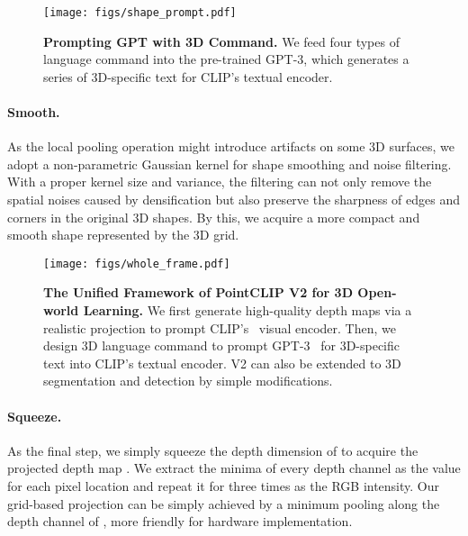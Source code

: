\documentclass[10pt,twocolumn,letterpaper]{article}
\begin{document}
\label{method:tasks}
\begin{figure}[t!]
\centering
\texttt{[image: figs/shape\_prompt.pdf]}
\vspace{0.15cm}
\caption{\textbf{Prompting GPT with 3D Command.} We feed four types of language command into the pre-trained GPT-3, which generates a series of 3D-specific text for CLIP's textual encoder.}
\label{fig:3d_command}
\vspace{-0.25cm}
\end{figure}

\vspace{-6pt}
\paragraph{Smooth.} 
As the local pooling operation might introduce artifacts on some 3D surfaces, we adopt a non-parametric Gaussian kernel for shape smoothing and noise filtering. With a proper kernel size and variance, the filtering can not only remove the spatial noises caused by densification but also preserve the sharpness of edges and corners in the original 3D shapes. By this, we acquire a more compact and smooth shape represented by the 3D grid.

\begin{figure*}[t!]
\centering
\texttt{[image: figs/whole\_frame.pdf]}
\vspace{0.1cm}
\caption{\textbf{The Unified Framework of PointCLIP V2 for 3D Open-world Learning.}
We first generate high-quality depth maps via a realistic projection to prompt CLIP's~\cite{radford2021learning} visual encoder. Then, we design 3D language command to prompt GPT-3~\cite{brown2020language} for 3D-specific text into CLIP's textual encoder. V2 can also be extended to 3D segmentation and detection by simple modifications.}
\label{fig:framework2}
\vspace{-0.1cm}
\end{figure*}

\vspace{-6pt}
\paragraph{Squeeze.} 
As the final step, we simply squeeze the depth dimension of  to acquire the projected depth map . We extract the minima of every depth channel as the value for each pixel location and repeat it for three times as the RGB intensity. Our grid-based projection can be simply achieved by a minimum pooling along the depth channel of , more friendly for hardware implementation.
\end{document}
